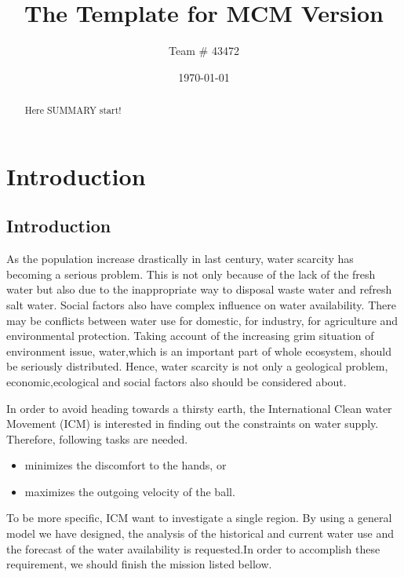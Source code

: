 \documentclass{mcmthesis}
\title{The Template for MCM Version }
\author{Team \# 43472}
\date{\today}
\begin{document}
\begin{abstract}
Here SUMMARY start!

\end{abstract}

\maketitle

\tableofcontents

\newpage

\section{Introduction}
\subsection{Introduction}

	
	As the population increase drastically in last century, water scarcity has becoming a serious problem. This is not only because of the lack of the fresh water but also due to the inappropriate way to disposal waste water and refresh salt water. Social factors also have complex influence on water availability. There may be conflicts between water use for domestic, for industry, for agriculture and environmental protection. Taking account of the increasing grim situation of 
environment issue, water,which is an important part of whole ecosystem, should be seriously distributed. Hence, water scarcity is not only a geological problem, economic,ecological and social factors also should be considered about. 
	
	In order to avoid heading towards a thirsty earth, the International Clean water Movement (ICM) is interested in finding out the constraints on water supply. Therefore, following tasks are needed.


\begin{itemize}
\item minimizes the discomfort to the hands, or
\item maximizes the outgoing velocity of the ball.
\end{itemize}

	To be more specific, ICM want to investigate a single region. By using a general model we have designed, the analysis of the historical and current water use and the forecast of the water availability is requested.In order to accomplish these requirement, we should finish the mission listed bellow.
\end{document}
